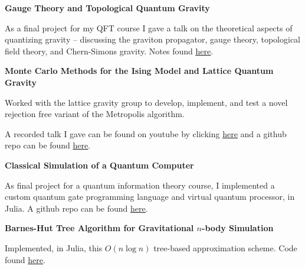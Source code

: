 \documentclass[9pt]{extarticle}
\begin{document}
\vspace{2.5pt}
\large\textbf{Gauge Theory and Topological Quantum Gravity}
\normalsize

\begin{compactitem}
\item As a final project for my QFT course I gave a talk on the theoretical aspects of quantizing gravity -- discussing the graviton propagator, gauge theory, topological field theory, and Chern-Simons gravity. Notes found \href{https://aarontrowbridge.github.io/notes/}{\underline{here}}.
\end{compactitem}


\vspace{2.5pt}
\large\textbf{Monte Carlo Methods for the Ising Model and Lattice Quantum Gravity}
\normalsize

\begin{compactitem}
\item Worked with the lattice gravity group to develop, implement, and test a novel rejection free variant of the Metropolis algorithm. 
\item A recorded talk I gave can be found on youtube by clicking \href{https://www.youtube.com/watch?v=_Ppx0e3aG-E&t=2s}{\underline{here}} and a github repo can be found \href{https://github.com/aarontrowbridge/Ising}{\underline{here}}.
\end{compactitem}

\vspace{2.5pt}
\large\textbf{Classical Simulation of a Quantum Computer}
\normalsize

\begin{compactitem}
\item As final project for a quantum information theory course, I implemented a custom quantum gate programming language and virtual quantum processor, in Julia. A github repo can be found \href{https://github.com/aarontrowbridge/QuIPS}{\underline{here}}.
\end{compactitem}


\vspace{2.5pt}
\large\textbf{Barnes-Hut Tree Algorithm for Gravitational $n$-body Simulation}
\normalsize

\begin{compactitem}
\item Implemented, in Julia, this $O(n \log n)$ tree-based approximation scheme. Code found \href{https://github.com/aarontrowbridge/Gravity}{\underline{here}}. 
\end{compactitem}
\end{document}
